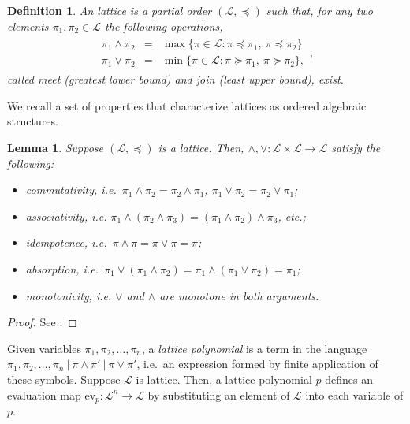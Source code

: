 \documentclass[conference]{ieeeconf}
\renewcommand{\L}{\mathcal{L}}
\newcommand{\join}{\vee}
\newcommand{\meet}{\wedge}
\newtheorem{lemma}{Lemma}
\newtheorem{definition}{Definition}
\begin{document}
\begin{definition} \label{def:lattice}
    An \emph{lattice} is a partial order $(\L, \preceq)$ such that, for any two elements $\pi_1, \pi_2 \in \L$ the following operations,
    \begin{align*}
        \begin{aligned}
        \pi_1 \meet \pi_2 &=& \max\{ \pi \in \L: \pi \preceq \pi_1,~\pi \preceq \pi_2 \} \\
        \pi_1 \join \pi_2 &=& \min\{ \pi \in \L: \pi \succeq \pi_1,~\pi \succeq \pi_2 \},       
        \end{aligned},
    \end{align*}
    called \emph{meet} (greatest lower bound) and \emph{join} (least upper bound), exist. 
\end{definition}

We recall a set of properties that characterize lattices as ordered algebraic structures.

\begin{lemma} \label{lem:lattice-axiom} 
    Suppose $(\L,\preceq)$ is a lattice. Then, $\meet, \join: \L \times \L \to \L$ satisfy the following:
    \begin{itemize}
        \item[(i)] \emph{commutativity}, i.e.~$\pi_1 \meet \pi_2 = \pi_2 \meet \pi_1$, $\pi_1 \join \pi_2 = \pi_2 \join \pi_1$;
        \item[(ii)] \emph{associativity}, i.e. {\small $\pi_1 \meet (\pi_2 \meet \pi_3) = (\pi_1 \meet \pi_2) \meet \pi_3$}, etc.;
        \item[(iii)] \emph{idempotence}, i.e.~$\pi \meet \pi = \pi \join \pi =  \pi$;
        \item[(iv)] \emph{absorption}, i.e.~$\pi_1 \join \left( \pi_1 \meet \pi_2 \right) = \pi_1 \meet \left( \pi_1 \join \pi_2 \right) = \pi_1$;
        \item[(v)] \emph{monotonicity}, i.e. $\join$ and $\meet$ are monotone in both arguments.
    \end{itemize}
\end{lemma}
\begin{proof}
    See \cite[\S I.4 Lemma 1, \S I.5 Lemma 3]{birkhoff1940}.
\end{proof}

Given variables $\pi_1,\pi_2,\dots,\pi_n$, a \emph{lattice polynomial} is a term in the language $\pi_1,\pi_2,\dots,\pi_n~\vert~\pi \meet \pi'~\vert~\pi \join \pi'$, i.e.~an expression formed by finite application of these symbols. Suppose $\L$ is  lattice. Then, a lattice polynomial $p$ defines an evaluation map $\mathrm{ev}_p: \L^n \to \L$ by substituting an element of $\L$ into each variable of $p$.
\end{document}
